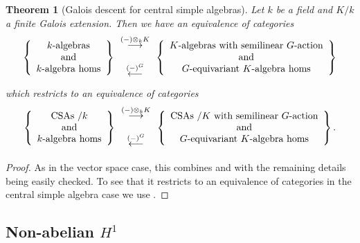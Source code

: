 \documentclass[11pt]{amsart}
\numberwithin{equation}{section}
\newtheorem{theorem}[equation]{Theorem}
\theoremstyle{remark}
\theoremstyle{remark}
\theoremstyle{remark}
\theoremstyle{definition}
\theoremstyle{definition}
\theoremstyle{definition}
\theoremstyle{definition}
\theoremstyle{definition}
\theoremstyle{definition}
\begin{document}
\begin{theorem}[Galois descent for central simple algebras]
Let $k$ be a field and $K/k$ a finite Galois extension. Then we have an equivalence of categories
\[\left\{\begin{array}{c}k\textup{-algebras}\\ \textup{and}\\ k\textup{-algebra homs}\end{array}\right\} \begin{array}{c}\stackrel{(-)\otimes_k K}{\longrightarrow}\\ \\ \stackrel{(-)^G}{\longleftarrow}\end{array} \left\{\begin{array}{c}K\textup{-algebras}\textup{ with semilinear }G\textup{-action}\\ \textup{and}\\ G\textup{-equivariant }K\textup{-algebra homs}\end{array}\right\}\]
which restricts to an equivalence of categories
\[\left\{\begin{array}{c}\textup{CSAs /}k\\ \textup{and}\\ k\textup{-algebra homs}\end{array}\right\} \begin{array}{c}\stackrel{(-)\otimes_k K}{\longrightarrow}\\ \\ \stackrel{(-)^G}{\longleftarrow}\end{array} \left\{\begin{array}{c}\textup{CSAs /}K\textup{ with semilinear }G\textup{-action}\\ \textup{and}\\ G\textup{-equivariant }K\textup{-algebra homs}\end{array}\right\}.\]
\end{theorem}

\begin{proof}
As in the vector space case, this combines  and  with the remaining details being easily checked. To see that it restricts to an equivalence of categories in the central simple algebra case we use . 
\end{proof}

\subsection{Non-abelian $H^1$}
\end{document}

